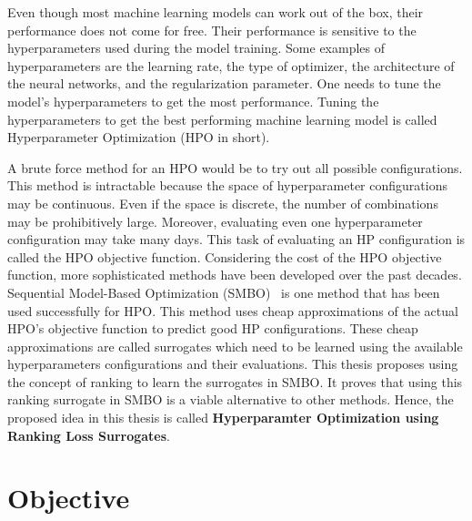 \documentclass[12pt, twoside, ngerman]{report}
\begin{document}
Even though most machine learning models can work out of the box, their performance does not come for free. Their performance is sensitive to the hyperparameters used during the model training. Some examples of hyperparameters are the learning rate, the type of optimizer, the architecture of the neural networks, and the regularization parameter.
One needs to tune the model's hyperparameters to get the most performance. Tuning the hyperparameters to get the best performing machine learning model is called Hyperparameter Optimization (HPO in short).

A brute force method for an HPO would be to try out all possible configurations. This method is intractable because the space of hyperparameter configurations may be continuous. Even if the space is discrete, the number of combinations may be prohibitively large. Moreover, evaluating even one hyperparameter configuration may take many days. This task of evaluating an HP configuration is called the HPO objective function. Considering the cost of the HPO objective function, more sophisticated methods have been developed over the past decades. Sequential Model-Based Optimization (SMBO)~\cite{NIPS2011_86e8f7ab} is one method that has been used successfully for HPO. This method uses cheap approximations of the actual HPO's objective function to predict good HP configurations. These cheap approximations are called surrogates which need to be learned using the available hyperparameters configurations and their evaluations. This thesis proposes using the concept of ranking to learn the surrogates in SMBO. It proves that using this ranking surrogate in SMBO is a viable alternative to other methods.
Hence, the proposed idea in this thesis is called \textbf{Hyperparamter Optimization using Ranking Loss Surrogates}.


\section{Objective}
\label{sec:HPODefinition}
\end{document}
